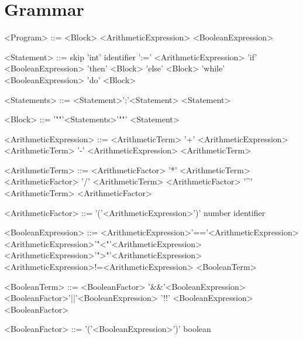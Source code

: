 \section*{Grammar}

\begin{grammar}
    <Program> ::= <Block>
    \alt <ArithmeticExpression>
    \alt <BooleanExpression>

    <Statement> ::= skip
    \alt 'int' identifier ':=' <ArithmeticExpression>
    \alt 'if' <BooleanExpression> 'then' <Block> 'else' <Block>
    \alt 'while' <BooleanExpression> 'do' <Block>

    <Statements> ::= <Statement>';'<Statement>
    \alt <Statement>

    <Block> ::= '"{"'<Statements>'"}"'
    \alt <Statement>

    <ArithmeticExpression> ::= <ArithmeticTerm> '+' <ArithmeticExpression>
    \alt <ArithmeticTerm> '-' <ArithmeticExpression>
    \alt <ArithmeticTerm>

    <ArithmeticTerm> ::= <ArithmeticFactor> '*' <ArithmeticTerm>
    \alt <ArithmeticFactor> '/' <ArithmeticTerm>
    \alt <ArithmeticFactor> '^' <ArithmeticTerm>
    \alt <ArithmeticFactor>

    <ArithmeticFactor> ::= '('<ArithmeticExpression>')'
    \alt number
    \alt identifier

    <BooleanExpression> ::= <ArithmeticExpression>'=='<ArithmeticExpression>
    \alt <ArithmeticExpression>'"<"'<ArithmeticExpression>
    \alt <ArithmeticExpression>'">"'<ArithmeticExpression>
    \alt <ArithmeticExpression>!=<ArithmeticExpression>
    \alt <BooleanTerm>

    <BooleanTerm> ::= <BooleanFactor> '\&\&'<BooleanExpression>
    \alt <BooleanFactor>'||'<BooleanExpression>
    \alt '!!' <BooleanExpression>
    \alt <BooleanFactor>

    <BooleanFactor> ::= '('<BooleanExpression>')'
    \alt boolean
\end{grammar}

